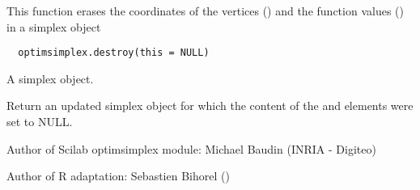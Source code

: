 %
\begin{Description}\relax
This function erases the coordinates of the vertices () and the
function values () in a simplex object
\end{Description}
%
\begin{Usage}
\begin{verbatim}
  optimsimplex.destroy(this = NULL)
\end{verbatim}
\end{Usage}
%
\begin{Arguments}
\begin{ldescription}
\item[\code{this}] A simplex object.
\end{ldescription}
\end{Arguments}
%
\begin{Value}
Return an updated simplex object for which the content of the  and
 elements were set to NULL.
\end{Value}
%
\begin{Author}\relax
Author of Scilab optimsimplex module: Michael Baudin (INRIA - Digiteo)

Author of R adaptation: Sebastien Bihorel ()
\end{Author}
%
\begin{SeeAlso}\relax
{}
\end{SeeAlso}
